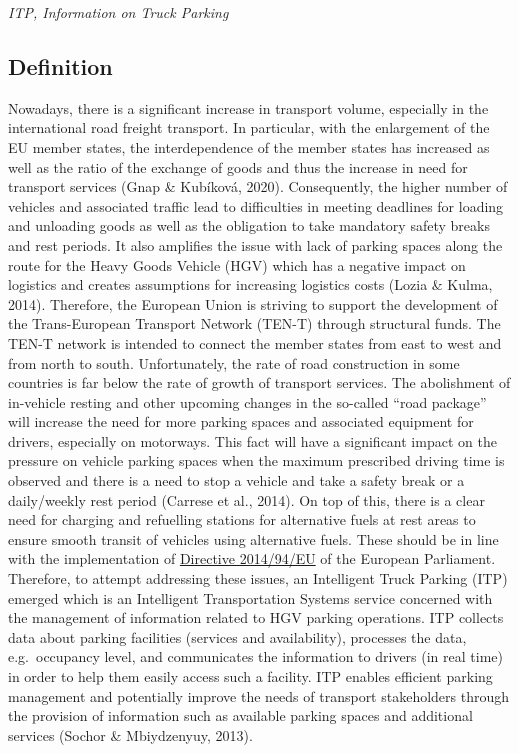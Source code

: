 \documentclass[
]{book}
\begin{document}
\emph{ITP, Information on Truck Parking}

\hypertarget{definition-31}{%
\subsection*{Definition}\label{definition-31}}

Nowadays, there is a significant increase in transport volume, especially in the international road freight transport. In particular, with the enlargement of the EU member states, the interdependence of the member states has increased as well as the ratio of the exchange of goods and thus the increase in need for transport services (Gnap \& Kubíková, 2020). Consequently, the higher number of vehicles and associated traffic lead to difficulties in meeting deadlines for loading and unloading goods as well as the obligation to take mandatory safety breaks and rest periods. It also amplifies the issue with lack of parking spaces along the route for the Heavy Goods Vehicle (HGV) which has a negative impact on logistics and creates assumptions for increasing logistics costs (Lozia \& Kulma, 2014).
Therefore, the European Union is striving to support the development of the Trans-European Transport Network (TEN-T) through structural funds. The TEN-T network is intended to connect the member states from east to west and from north to south. Unfortunately, the rate of road construction in some countries is far below the rate of growth of transport services. The abolishment of in-vehicle resting and other upcoming changes in the so-called ``road package'' will increase the need for more parking spaces and associated equipment for drivers, especially on motorways. This fact will have a significant impact on the pressure on vehicle parking spaces when the maximum prescribed driving time is observed and there is a need to stop a vehicle and take a safety break or a daily/weekly rest period (Carrese et al., 2014). On top of this, there is a clear need for charging and refuelling stations for alternative fuels at rest areas to ensure smooth transit of vehicles using alternative fuels. These should be in line with the implementation of \href{https://eur-lex.europa.eu/legal-content/en/TXT/?uri=CELEX\%3A32014L0094}{Directive 2014/94/EU} of the European Parliament.
Therefore, to attempt addressing these issues, an Intelligent Truck Parking (ITP) emerged which is an Intelligent Transportation Systems service concerned with the management of information related to HGV parking operations. ITP collects data about parking facilities (services and availability), processes the data, e.g.~occupancy level, and communicates the information to drivers (in real time) in order to help them easily access such a facility. ITP enables efficient parking management and potentially improve the needs of transport stakeholders through the provision of information such as available parking spaces and additional services (Sochor \& Mbiydzenyuy, 2013).
\end{document}
